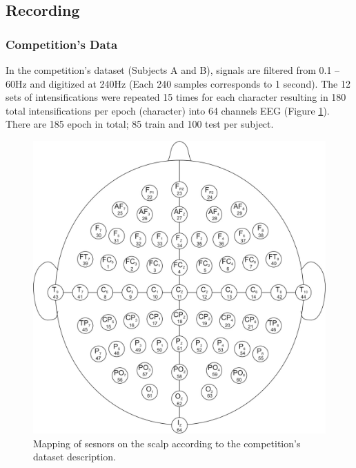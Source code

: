 \subsection{Recording}
\subsubsection{Competition's Data}
In the competition's dataset (Subjects A and B), signals are filtered from 0.1 – 60Hz and digitized at 240Hz (Each 240 samples corresponds to 1 second). The 12 sets of intensifications were repeated 15 times for each character resulting in 180 total intensifications per epoch (character) into 64 channels EEG (Figure \ref{fig:competition-64-channels}). There are 185 epoch in total; 85 train and 100 test per subject.\par
\begin{figure}[!ht]
    \centering
    \includegraphics[width=\figureWidth]{images/approach/competition_64_channels.jpg}
    \caption{Mapping of sesnors on the scalp according to the competition's dataset description.}
    \label{fig:competition-64-channels}
\end{figure}
